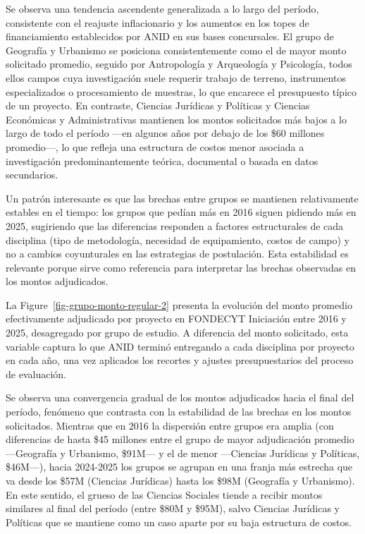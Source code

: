 \documentclass[
  12pt,
  letterpaper,
]{article}
\begin{document}
Se observa una tendencia ascendente generalizada a lo largo del período,
consistente con el reajuste inflacionario y los aumentos en los topes de
financiamiento establecidos por ANID en sus bases concursales. El grupo
de Geografía y Urbanismo se posiciona consistentemente como el de mayor
monto solicitado promedio, seguido por Antropología y Arqueología y
Psicología, todos ellos campos cuya investigación suele requerir trabajo
de terreno, instrumentos especializados o procesamiento de muestras, lo
que encarece el presupuesto típico de un proyecto. En contraste,
Ciencias Jurídicas y Políticas y Ciencias Económicas y Administrativas
mantienen los montos solicitados más bajos a lo largo de todo el período
---en algunos años por debajo de los \$60 millones promedio---, lo que
refleja una estructura de costos menor asociada a investigación
predominantemente teórica, documental o basada en datos secundarios.

Un patrón interesante es que las brechas entre grupos se mantienen
relativamente estables en el tiempo: los grupos que pedían más en 2016
siguen pidiendo más en 2025, sugiriendo que las diferencias responden a
factores estructurales de cada disciplina (tipo de metodología,
necesidad de equipamiento, costos de campo) y no a cambios coyunturales
en las estrategias de postulación. Esta estabilidad es relevante porque
sirve como referencia para interpretar las brechas observadas en los
montos adjudicados.

La Figure~\ref{fig-grupo-monto-regular-2} presenta la evolución del
monto promedio efectivamente adjudicado por proyecto en FONDECYT
Iniciación entre 2016 y 2025, desagregado por grupo de estudio. A
diferencia del monto solicitado, esta variable captura lo que ANID
terminó entregando a cada disciplina por proyecto en cada año, una vez
aplicados los recortes y ajustes presupuestarios del proceso de
evaluación.

Se observa una convergencia gradual de los montos adjudicados hacia el
final del período, fenómeno que contrasta con la estabilidad de las
brechas en los montos solicitados. Mientras que en 2016 la dispersión
entre grupos era amplia (con diferencias de hasta \$45 millones entre el
grupo de mayor adjudicación promedio ---Geografía y Urbanismo, \$91M---
y el de menor ---Ciencias Jurídicas y Políticas, \$46M---), hacia
2024-2025 los grupos se agrupan en una franja más estrecha que va desde
los \$57M (Ciencias Jurídicas) hasta los \$98M (Geografía y Urbanismo).
En este sentido, el grueso de las Ciencias Sociales tiende a recibir
montos similares al final del período (entre \$80M y \$95M), salvo
Ciencias Jurídicas y Políticas que se mantiene como un caso aparte por
su baja estructura de costos.
\end{document}
